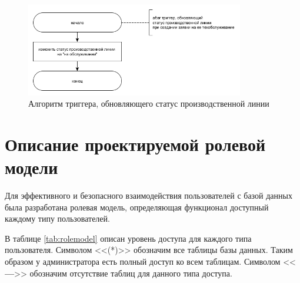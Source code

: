 \begin{figure}[H]
    \centering
    \includegraphics[width=0.85\textwidth]{templates/coursework/inc/img/trigger4.png}
    \caption{Алгоритм триггера, обновляющего статус производственной линии}
    \label{img:trigger4}
\end{figure}

\section{Описание проектируемой ролевой модели}

Для эффективного и безопасного взаимодействия пользователей с базой данных была разработана ролевая модель, определяющая функционал доступный каждому типу пользователей.

В таблице \ref{tab:rolemodel} описан уровень доступа для каждого типа пользователя. Символом <<(*)>> обозначим все таблицы базы данных. Таким образом у администратора есть полный доступ ко всем таблицам. Символом <<\textbf{---}>> обозначим отсутствие таблиц для данного типа доступа.




